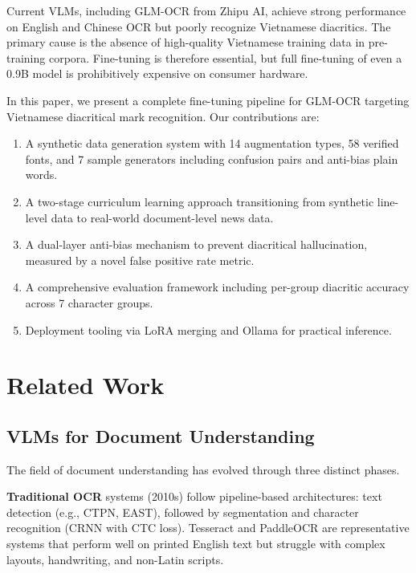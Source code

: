 \documentclass[11pt]{article}
\begin{document}
Current VLMs, including GLM-OCR \cite{glm-ocr} from Zhipu AI, achieve strong performance on English and Chinese OCR but poorly recognize Vietnamese diacritics. 
The primary cause is the absence of high-quality Vietnamese training data in pre-training corpora. 
Fine-tuning is therefore essential, but full fine-tuning of even a 0.9B model is prohibitively expensive on consumer hardware.

In this paper, we present a complete fine-tuning pipeline for GLM-OCR targeting Vietnamese diacritical mark recognition. 
Our contributions are:
\begin{enumerate}[nosep,leftmargin=*]
    \item A synthetic data generation system with 14 augmentation types, 58 verified fonts, and 7 sample generators including confusion pairs and anti-bias plain words.
    \item A two-stage curriculum learning approach transitioning from synthetic line-level data to real-world document-level news data.
    \item A dual-layer anti-bias mechanism to prevent diacritical hallucination, measured by a novel false positive rate metric.
    \item A comprehensive evaluation framework including per-group diacritic accuracy across 7 character groups.
    \item Deployment tooling via LoRA merging and Ollama for practical inference.
\end{enumerate}

\section{Related Work}

\subsection{VLMs for Document Understanding}

The field of document understanding has evolved through three distinct phases.

\textbf{Traditional OCR} systems (2010s) follow pipeline-based architectures: text detection (e.g., CTPN, EAST), followed by segmentation and character recognition (CRNN with CTC loss). 
Tesseract \cite{smith2007ocr} and PaddleOCR \cite{paddleocr2022} are representative systems that perform well on printed English text but struggle with complex layouts, handwriting, and non-Latin scripts.
\end{document}
